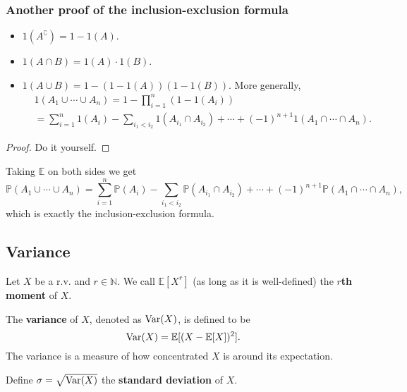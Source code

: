 \subsubsection*{Another proof of the inclusion-exclusion formula}
\begin{proposition}
    \begin{itemize}
        \item $ 1(A^\complement) = 1-1(A) $.
        \item $ 1(A \cap B) = 1(A)\cdot 1(B) $.
        \item $ 1(A \cup B) = 1-(1-1(A))(1-1(B)) $. More generally,
        \begin{align*}
            &1(A_1\cup \cdots \cup A_n) = 1-\prod_{i=1}^{n}(1-1(A_i))\\ 
            &= \sum_{i=1}^{n}1(A_i) -\sum_{i_1<i_2} 1(A_{i_1}\cap A_{i_2})+\cdots+(-1)^{n+1}1(A_1\cap \cdots\cap A_n).
        \end{align*}
    \end{itemize}
\end{proposition}
\begin{proof}
    Do it yourself.
\end{proof}
Taking $\mathbb{E}$ on both sides we get 
\[
    \mathbb{P}{(A_1\cup\cdots\cup A_n)} = \sum_{i=1}^{n}\mathbb{P}(A_i)-\sum_{i_1<i_2} \mathbb{P}(A_{i_1}\cap A_{i_2})+\cdots+(-1)^{n+1}\mathbb{P}(A_1\cap\cdots\cap A_n),
\]
which is exactly the inclusion-exclusion formula.

\subsection{Variance}
\begin{definition}
    Let $X$ be a r.v. and $ r\in \mathbb{N} $. We call $ \mathbb{E}[X^r] $ (as long as it is well-defined) the \textbf{$r$th moment} of $X$.
\end{definition}
\begin{definition}
    The \textbf{variance} of $X$, denoted as $ \operatorname{Var}(X) $, is defined to be 
    \[
        \operatorname{Var}(X) = \mathbb{E}[(X-\mathbb{E}[X])^2].
    \]
    The variance is a measure of how concentrated $X$ is around its expectation.

    Define $ \sigma=\sqrt{\operatorname{Var}(X)} $ the \textbf{standard deviation} of $X$.
\end{definition}
